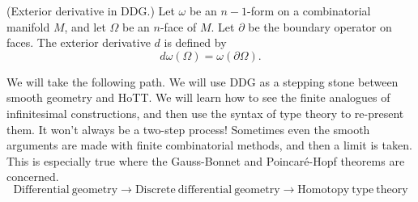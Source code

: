 \begin{mydef}
(Exterior derivative in DDG.) Let \( \omega \) be an \( n-1 \)-form on a combinatorial manifold \( M \), and let \( \Omega \) be an \( n \)-face of \( M \). Let \( \partial \) be the boundary operator on faces. The exterior derivative \( d \) is defined by 
\[ 
 d\omega(\Omega) = \omega(\partial\Omega).
\]
\end{mydef}

We will take the following path. We will use DDG as a stepping stone between smooth geometry and HoTT. We will learn how to see the finite analogues of infinitesimal constructions, and then use the syntax of type theory to re-present them. It won't always be a two-step process! Sometimes even the smooth arguments are made with finite combinatorial methods, and then a limit is taken. This is especially true where the Gauss-Bonnet and Poincaré-Hopf theorems are concerned.
\[\mathrm{Differential\ geometry}\longrightarrow\mathrm{Discrete\ differential\ geometry}\longrightarrow \mathrm{Homotopy\ type\ theory}\]
